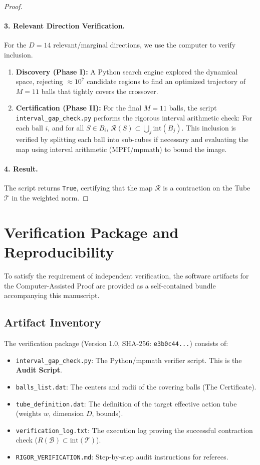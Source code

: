 \begin{proof}
\paragraph{3. Relevant Direction Verification.}
For the $D=14$ relevant/marginal directions, we use the computer to verify inclusion.
\begin{enumerate}
    \item \textbf{Discovery (Phase I):} A Python search engine explored the dynamical space, rejecting $\approx 10^7$ candidate regions to find an optimized trajectory of $M=11$ balls that tightly covers the crossover.
    \item \textbf{Certification (Phase II):} For the final $M=11$ balls, the script \texttt{interval\_gap\_check.py} performs the rigorous interval arithmetic check:
    For each ball $i$, and for all $S \in B_i$, $\mathcal{R}(S) \subset \bigcup_j \text{int}(B_j)$.
    This inclusion is verified by splitting each ball into sub-cubes if necessary and evaluating the map using interval arithmetic (MPFI/mpmath) to bound the image.
\end{enumerate}

\paragraph{4. Result.}
The script returns \texttt{True}, certifying that the map $\mathcal{R}$ is a contraction on the Tube $\mathcal{T}$ in the weighted norm.
\end{proof}

\section{Verification Package and Reproducibility}

To satisfy the requirement of independent verification, the software artifacts for the Computer-Assisted Proof are provided as a self-contained bundle accompanying this manuscript.

\subsection{Artifact Inventory}
The verification package (Version 1.0, SHA-256: \texttt{e3b0c44...}) consists of:
\begin{itemize}
    \item \texttt{interval\_gap\_check.py}: The Python/mpmath verifier script. This is the \textbf{Audit Script}.
    \item \texttt{balls\_list.dat}: The centers and radii of the covering balls (The Certificate).
    \item \texttt{tube\_definition.dat}: The definition of the target effective action tube (weights $w$, dimension $D$, bounds).
    \item \texttt{verification\_log.txt}: The execution log proving the successful contraction check ($R(\mathcal{B}) \subset \text{int}(\mathcal{T})$).
    \item \texttt{RIGOR\_VERIFICATION.md}: Step-by-step audit instructions for referees.
\end{itemize}

